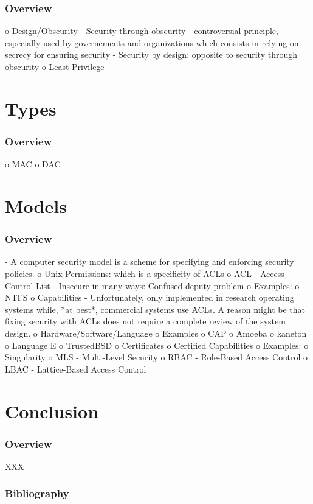 
\begin{frame}
  \frametitle{Overview}

  o Design/Obscurity
    - Security through obscurity
        - controversial principle, especially used by governements and organizations which consists in
          relying on secrecy for ensuring security
    - Security by design: opposite to security through obscurity
  o Least Privilege
\end{frame}

%
%

\section{Types}


\begin{frame}
  \frametitle{Overview}

  o MAC
  o DAC
\end{frame}

%
%

\section{Models}


\begin{frame}
  \frametitle{Overview}

  - A computer security model is a scheme for specifying and enforcing security policies.
  o Unix Permissions: which is a specificity of ACLs
  o ACL - Access Control List
    - Insecure in many ways: Confused deputy problem
    o Examples:
      o NTFS
  o Capabilities
    - Unfortunately, only implemented in research operating systems while, *at best*, commercial
      systems use ACLs. A reason might be that fixing security with ACLs does not require
      a complete review of the system design.
    o Hardware/Software/Language
    o Examples
      o CAP
      o Amoeba
      o kaneton
      o Language E
      o TrustedBSD
  o Certificates
    o Certified Capabilities
    o Examples:
      o Singularity
  o MLS - Multi-Level Security
  o RBAC - Role-Based Access Control
  o LBAC - Lattice-Based Access Control
\end{frame}

%
%

\section{Conclusion}


\begin{frame}
  \frametitle{Overview}

  XXX
\end{frame}

%
%

\begin{frame}
  \frametitle{Bibliography}

  
  
\end{frame}


